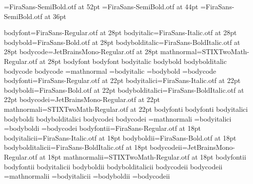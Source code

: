 

\def\setaspectratioIVbyIII{%
    \pagewidth=1024pt
    \pageheight=768pt
    \hsize=896pt     
    \vsize=672pt     
    \outputhorigin=64pt 
    \outputvorigin=48pt 
}

\def\setaspectratioXVIbyIX{%
    \pagewidth=1280pt
    \pageheight=720pt
    \hsize=1188pt    
    \vsize=648pt     
    \outputhorigin=46pt 
    \outputvorigin=36pt 
}

\setaspectratioIVbyIII
\nopagenumbers
\parindent=0pt 

\def\textfamily{FiraSans}
\def\monofamily{JetBrainsMono}
\def\mathfamily{STIXTwoMath}

\font\titlefont=\textfamily-SemiBold.otf at 52pt
\font\headingfont=\textfamily-SemiBold.otf at 44pt
\font\subheadingfont=\textfamily-SemiBold.otf at 36pt

\def\declarefontlevel#1#2#3{%
  \expandafter\font\csname bodyfont#1\endcsname=\textfamily-Regular.otf at #2\relax
  \expandafter\font\csname bodyitalic#1\endcsname=\textfamily-Italic.otf at #2\relax
  \expandafter\font\csname bodybold#1\endcsname=\textfamily-Bold.otf at #2\relax
  \expandafter\font\csname bodybolditalic#1\endcsname=\textfamily-BoldItalic.otf at #2\relax
  \expandafter\font\csname bodycode#1\endcsname=\monofamily-Regular.otf at #2\relax
  \expandafter\font\csname mathnormal#1\endcsname=\mathfamily-Regular.otf at #2\relax
  \expandafter\def\csname applyfontset#1\endcsname{%
    \csname bodyfont#1\endcsname
    \baselineskip=#3\relax
    \expandafter\let\expandafter\rm\csname bodyfont#1\endcsname
    \expandafter\let\expandafter\it\csname bodyitalic#1\endcsname
    \expandafter\let\expandafter\bf\csname bodybold#1\endcsname
    \expandafter\let\expandafter\bi\csname bodybolditalic#1\endcsname
    \expandafter\let\expandafter\tt\csname bodycode#1\endcsname
    \expandafter\let\expandafter\code\csname bodycode#1\endcsname
    \expandafter\textfont0=\csname mathnormal#1\endcsname
    \expandafter\textfont\itfam=\csname bodyitalic#1\endcsname
    \expandafter\textfont\bffam=\csname bodybold#1\endcsname
    \expandafter\textfont\ttfam=\csname bodycode#1\endcsname
  }%
}

\declarefontlevel{}{28pt}{36pt}   %
\declarefontlevel{i}{22pt}{26pt}  %
\declarefontlevel{ii}{18pt}{24pt} %

